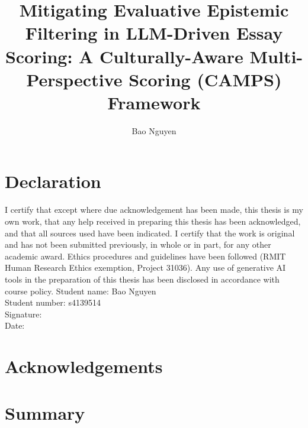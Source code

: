 %
\title{\huge{Mitigating Evaluative Epistemic Filtering in LLM-Driven Essay Scoring: A Culturally-Aware Multi-Perspective Scoring (CAMPS) Framework}}
\author{Bao Nguyen}


\maketitle
\cleardoublepage
\setcounter{savepage}{\thepage}
\section*{Declaration}
I certify that except where due acknowledgement has been made, this thesis
is my own work, that any help received in preparing this thesis has been
acknowledged, and that all sources used have been indicated. I certify that
the work is original and has not been submitted previously, in whole or in
part, for any other academic award. Ethics procedures and guidelines
have been followed (RMIT Human Research Ethics exemption, Project
31036). Any use of generative AI tools in the preparation of this
thesis has been disclosed in accordance with course policy.
\vspace{2cm}
\noindent Student name: Bao Nguyen \\
\noindent Student number: s4139514 \\
\noindent Signature: \dotfill \\
\noindent Date: \dotfill
\cleardoublepage
\section*{Acknowledgements}

\cleardoublepage
\section*{Summary}

\cleardoublepage
\begin{abstractpage}

\end{abstractpage}
